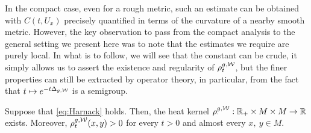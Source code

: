 \documentclass[a4paper, 12pt]{amsart}
\begin{document}
In the compact case, even for a
rough metric, such an estimate can be
obtained with $C(t,U_x)$ precisely quantified
in terms of the curvature of a nearby smooth metric.
However, the key observation to pass from the compact analysis
to the general setting we present here was to note that
the estimates we require are purely local. In 
what is to follow, we will see that the constant can be
crude, it simply allows us to assert the existence and regularity
of $\rho^{g,\mathcal{W}}_t$, but the finer properties can still 
be extracted by operator theory, in particular, from the 
fact that $t \mapsto e^{-t\Delta_{g,\mathcal{W}}}$ is a semigroup.

\begin{prop}
\label{prop:MainRed}
Suppose that \eqref{eq:Harnack} holds. Then, the heat
kernel $\rho^{g,\mathcal{W}}_{\cdotp}: \mathbb{R}_{+} \times M \times M \to \mathbb{R}$
exists. Moreover, $\rho^{g,\mathcal{W}}_t(x,y) > 0$ for
every $t > 0$ and almost every $x,\ y \in M$. 
\end{prop} 
\end{document}

